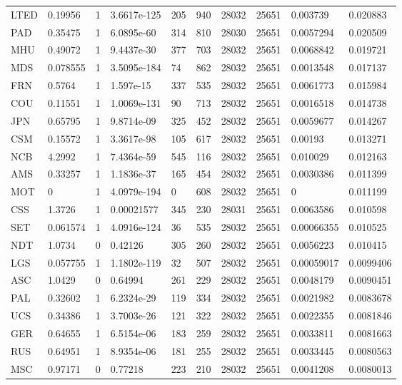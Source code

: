 {\begin{longtable}{llllllllll}
LTED & 0.19956 & 1 & 3.6617e-125 & 205 & 940 & 28032 & 25651 & 0.003739 & 0.020883 \\ 
PAD & 0.35475 & 1 & 6.0895e-60 & 314 & 810 & 28030 & 25651 & 0.0057294 & 0.020509 \\ 
MHU & 0.49072 & 1 & 9.4437e-30 & 377 & 703 & 28032 & 25651 & 0.0068842 & 0.019721 \\ 
MDS & 0.078555 & 1 & 3.5095e-184 & 74 & 862 & 28032 & 25651 & 0.0013548 & 0.017137 \\ 
FRN & 0.5764 & 1 & 1.597e-15 & 337 & 535 & 28032 & 25651 & 0.0061773 & 0.015984 \\ 
COU & 0.11551 & 1 & 1.0069e-131 & 90 & 713 & 28032 & 25651 & 0.0016518 & 0.014738 \\ 
JPN & 0.65795 & 1 & 9.8714e-09 & 325 & 452 & 28032 & 25651 & 0.0059677 & 0.014267 \\ 
CSM & 0.15572 & 1 & 3.3617e-98 & 105 & 617 & 28032 & 25651 & 0.00193 & 0.013271 \\ 
NCB & 4.2992 & 1 & 7.4364e-59 & 545 & 116 & 28032 & 25651 & 0.010029 & 0.012163 \\ 
AMS & 0.33257 & 1 & 1.1836e-37 & 165 & 454 & 28032 & 25651 & 0.0030386 & 0.011399 \\ 
MOT & 0 & 1 & 4.0979e-194 & 0 & 608 & 28032 & 25651 & 0 & 0.011199 \\ 
CSS & 1.3726 & 1 & 0.00021577 & 345 & 230 & 28031 & 25651 & 0.0063586 & 0.010598 \\ 
SET & 0.061574 & 1 & 4.0916e-124 & 36 & 535 & 28032 & 25651 & 0.00066355 & 0.010525 \\ 
NDT & 1.0734 & 0 & 0.42126 & 305 & 260 & 28032 & 25651 & 0.0056223 & 0.010415 \\ 
LGS & 0.057755 & 1 & 1.1802e-119 & 32 & 507 & 28032 & 25651 & 0.00059017 & 0.0099406 \\ 
ASC & 1.0429 & 0 & 0.64994 & 261 & 229 & 28032 & 25651 & 0.0048179 & 0.0090451 \\ 
PAL & 0.32602 & 1 & 6.2324e-29 & 119 & 334 & 28032 & 25651 & 0.0021982 & 0.0083678 \\ 
UCS & 0.34386 & 1 & 3.7003e-26 & 121 & 322 & 28032 & 25651 & 0.0022355 & 0.0081846 \\ 
GER & 0.64655 & 1 & 6.5154e-06 & 183 & 259 & 28032 & 25651 & 0.0033811 & 0.0081663 \\ 
RUS & 0.64951 & 1 & 8.9354e-06 & 181 & 255 & 28032 & 25651 & 0.0033445 & 0.0080563 \\ 
MSC & 0.97171 & 0 & 0.77218 & 223 & 210 & 28032 & 25651 & 0.0041208 & 0.0080013 \\ 

\end{longtable}}
